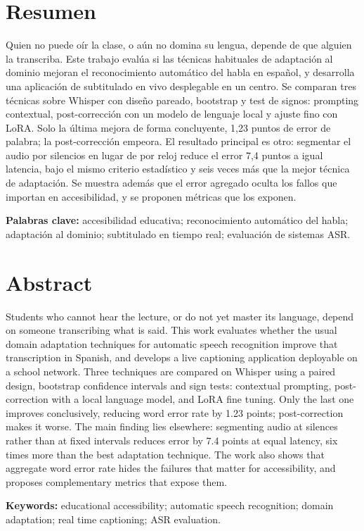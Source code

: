 \chapter{Resumen}

Quien no puede oír la clase, o aún no domina su lengua, depende de que alguien la
transcriba. Este trabajo evalúa si las técnicas habituales de adaptación al dominio mejoran
el reconocimiento automático del habla en español, y desarrolla una aplicación de
subtitulado en vivo desplegable en un centro. Se comparan tres técnicas sobre Whisper con
diseño pareado, bootstrap y test de signos: prompting contextual, post-corrección con un
modelo de lenguaje local y ajuste fino con LoRA. Solo la última mejora de forma
concluyente, 1,23 puntos de error de palabra; la post-corrección empeora. El resultado
principal es otro: segmentar el audio por silencios en lugar de por reloj reduce el error
7,4 puntos a igual latencia, bajo el mismo criterio estadístico y seis veces más que la
mejor técnica de adaptación. Se muestra
además que el error agregado oculta los fallos que importan en accesibilidad, y se proponen
métricas que los exponen.

\vspace{0.5cm}
\noindent\textbf{Palabras clave:} accesibilidad educativa; reconocimiento automático del
habla; adaptación al dominio; subtitulado en tiempo real; evaluación de sistemas ASR.

\chapter{Abstract}

Students who cannot hear the lecture, or do not yet master its language, depend on someone
transcribing what is said. This work evaluates whether the usual domain adaptation
techniques for automatic speech recognition improve that transcription in Spanish, and
develops a live captioning application deployable on a school network. Three techniques are
compared on Whisper using a paired design, bootstrap confidence intervals and sign tests:
contextual prompting, post-correction with a local language model, and LoRA fine tuning. Only the last one
improves conclusively, reducing word error rate by 1.23 points; post-correction makes it
worse. The main finding lies elsewhere: segmenting audio at silences rather than at fixed
intervals reduces error by 7.4 points at equal latency, six times more than the best
adaptation technique. The work also shows that aggregate word error rate hides the failures
that matter for accessibility, and proposes complementary metrics that expose them.

\vspace{0.5cm}
\noindent\textbf{Keywords:} educational accessibility; automatic speech recognition;
domain adaptation; real time captioning; ASR evaluation.
